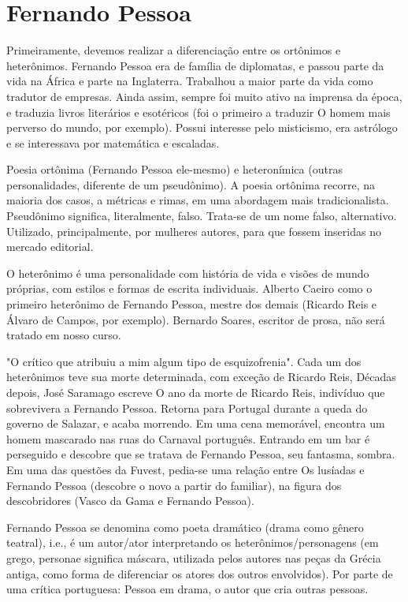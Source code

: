 \section{Fernando Pessoa}

Primeiramente, devemos realizar a diferenciação entre os ortônimos e heterônimos. Fernando Pessoa era de família de diplomatas, e passou parte da vida na África e parte na Inglaterra. Trabalhou a maior parte da vida como tradutor de empresas. Ainda assim, sempre foi muito ativo na imprensa da época, e traduzia livros literários e esotéricos (foi o primeiro a traduzir O homem mais perverso do mundo, por exemplo). Possui interesse pelo misticismo, era astrólogo e se interessava por matemática e escaladas.

Poesia ortônima (Fernando Pessoa ele-mesmo) e heteronímica (outras personalidades, diferente de um pseudônimo). A poesia ortônima recorre, na maioria dos casos, a métricas e rimas, em uma abordagem mais tradicionalista. Pseudônimo significa, literalmente, falso. Trata-se de um nome falso, alternativo. Utilizado, principalmente, por mulheres autores, para que fossem inseridas no mercado editorial.

O heterônimo é uma personalidade com história de vida e visões de mundo próprias, com estilos e formas de escrita individuais. Alberto Caeiro como o primeiro heterônimo de Fernando Pessoa, mestre dos demais (Ricardo Reis e Álvaro de Campos, por exemplo). Bernardo Soares, escritor de prosa, não será tratado em nosso curso.

"O crítico que atribuiu a mim algum tipo de esquizofrenia". Cada um dos heterônimos teve sua morte determinada, com exceção de Ricardo Reis, Décadas depois, José Saramago escreve O ano da morte de Ricardo Reis, indivíduo que sobrevivera a Fernando Pessoa. Retorna para Portugal durante a queda do governo de Salazar, e acaba morrendo. Em uma cena memorável, encontra um homem mascarado nas ruas do Carnaval português. Entrando em um bar é perseguido e descobre que se tratava de Fernando Pessoa, seu fantasma, sombra. Em uma das questões da Fuvest, pedia-se uma relação entre Os lusíadas e Fernando Pessoa (descobre o novo a partir do familiar), na figura dos descobridores (Vasco da Gama e Fernando Pessoa).

Fernando Pessoa se denomina como poeta dramático (drama como gênero teatral), i.e., é um autor/ator interpretando os heterônimos/personagens (em grego, personae significa máscara, utilizada pelos autores nas peças da Grécia antiga, como forma de diferenciar os atores dos outros envolvidos). Por parte de uma crítica portuguesa: Pessoa em drama, o autor que cria outras pessoas.

